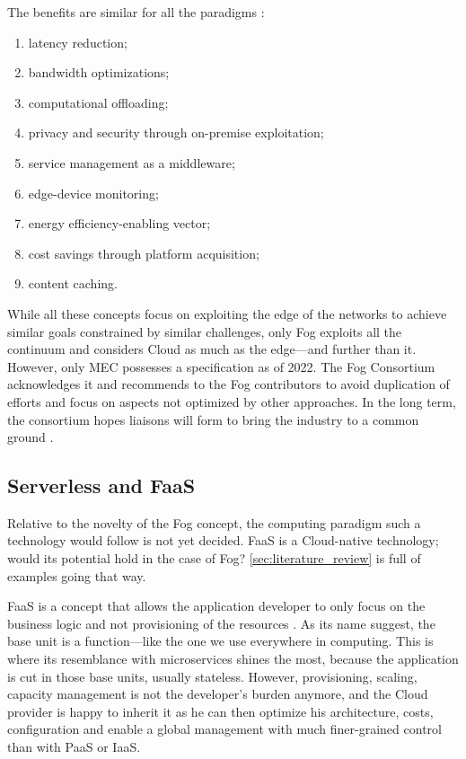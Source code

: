 The benefits are similar for all the paradigms \cite{ahmed_fog_2019, ai_edge_2018}:
\begin{enumerate}[(1)]
	\item latency reduction;
	\item bandwidth optimizations;
	\item computational offloading;
	\item privacy and security through on-premise exploitation;
	\item service management as a middleware;
	\item edge-device monitoring;
	\item energy efficiency-enabling vector;
	\item cost savings through platform acquisition;
	\item content caching.
\end{enumerate}

While all these concepts focus on exploiting the edge of the networks to achieve similar goals constrained by similar challenges, only Fog exploits all the continuum and considers Cloud as much as the edge—and further than it. However, only \gls{MEC} possesses a specification as of 2022. The Fog Consortium acknowledges it and recommends to the Fog contributors to avoid duplication of efforts and focus on aspects not optimized by other approaches. In the long term, the consortium hopes liaisons will form to bring the industry to a common ground \cite{ieee_standards_association_ieee_2018}.

\hypersetup{linkcolor=}
\subsection{Serverless and \acrfull{FaaS}}

Relative to the novelty of the Fog concept, the computing paradigm such a technology would follow is not yet decided. \gls{FaaS} is a Cloud-native technology; would its potential hold in the case of Fog? \cref{sec:literature_review} is full of examples going that way.

\gls{FaaS} is a concept that allows the application developer to only focus on the business logic and not provisioning of the resources \cite{redhat_what_2020}. As its name suggest, the base unit is a function—like the one we use everywhere in computing. This is where its resemblance with microservices shines the most, because the application is cut in those base units, usually stateless. However, provisioning, scaling, capacity management is not the developer's burden anymore, and the Cloud provider is happy to inherit it as he can then optimize his architecture, costs, configuration and enable a global management with much finer-grained control than with \gls{PaaS} or \gls{IaaS}.

